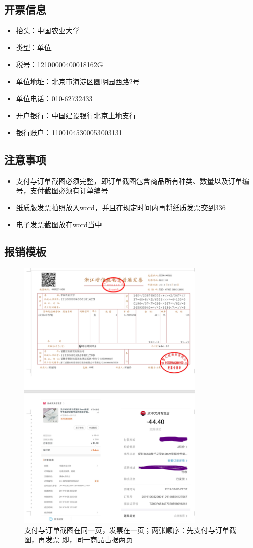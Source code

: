 \documentclass{ctexbook}
\begin{document}
\subsection{开票信息}
\begin{itemize}
    \item 抬头：中国农业大学
    \item 类型：单位
    \item 税号：12100000400018162G
    \item 单位地址：北京市海淀区圆明园西路2号
    \item 单位电话：010-62732433
    \item 开户银行：中国建设银行北京上地支行
    \item 银行账户：11001045300053003131
\end{itemize}
\subsection{注意事项}
\begin{itemize}
    \item 支付与订单截图必须完整，即订单截图包含商品所有种类、数量以及订单编号，支付截图必须有订单编号
    \item 纸质版发票拍照放入word，并且在规定时间内再将纸质发票交到336
    \item 电子发票截图放在word当中
\end{itemize}
\subsection{报销模板}
\begin{figure}
    \centering
    \includegraphics[width=0.8\textwidth]{fig/发票报销.png}
    \caption{支付与订单截图在同一页，发票在一页；两张顺序：先支付与订单截图，再发票
    即，同一商品占据两页}
\end{figure}
\end{document}
